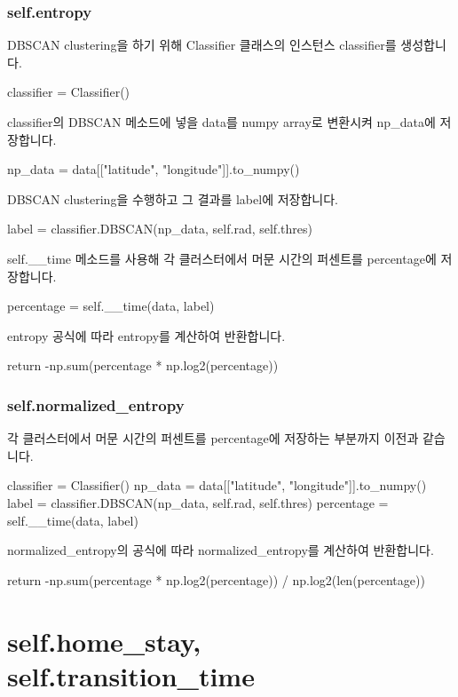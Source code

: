 \documentclass{oblivoir}
\begin{document}
  \subsubsection{self.entropy}
  DBSCAN clustering을 하기 위해 Classifier 클래스의 인스턴스 classifier를 생성합니다.
  \begin{python}[label={GPS_feature_21}]
    classifier = Classifier()
  \end{python}
  classifier의 DBSCAN 메소드에 넣을 data를 numpy array로 변환시켜 np\_data에 저장합니다.
  \begin{python}[label={GPS_feature_22}]
    np_data = data[["latitude", "longitude"]].to_numpy()
  \end{python}
  DBSCAN clustering을 수행하고 그 결과를 label에 저장합니다.
  \begin{python}[label={GPS_feature_23}]
    label = classifier.DBSCAN(np_data, self.rad, self.thres)
  \end{python}
  self.\_\_time 메소드를 사용해 각 클러스터에서 머문 시간의 퍼센트를 percentage에 저장합니다.
  \begin{python}[label={GPS_feature_24}]
    percentage = self.__time(data, label)
  \end{python}
  entropy 공식에 따라 entropy를 계산하여 반환합니다.
  \begin{python}[label={GPS_feature_25}]
    return -np.sum(percentage * np.log2(percentage))
  \end{python}

  \subsubsection{self.normalized\_entropy}
  각 클러스터에서 머문 시간의 퍼센트를 percentage에 저장하는 부분까지 이전과 같습니다.
  \begin{python}[label={GPS_feature_26}]
    classifier = Classifier()
    np_data = data[["latitude", "longitude"]].to_numpy()
    label = classifier.DBSCAN(np_data, self.rad, self.thres)
    percentage = self.__time(data, label)
  \end{python}
  normalized\_entropy의 공식에 따라 normalized\_entropy를 계산하여 반환합니다.
  \begin{python}[label={GPS_feature_27}]
    return -np.sum(percentage * np.log2(percentage)) / np.log2(len(percentage))
  \end{python}

  \section{self.home\_stay, self.transition\_time}
\end{document}

